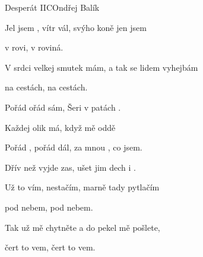 \setcounter{page}{20}
\begin{song}{Desperát II}{C}{Ondřej Balík}
\begin{SBVerse}
Jel jsem , vítr vál, svýho koně jen jsem 

v rovi, v roviná. 

V srdci velkej smutek mám, a tak se lidem vyhejbám 

na cestách, na cestách. 
\end{SBVerse}
\begin{SBChorus}
Pořád ořád sám, Šeri v patách .

Každej olik má, když mě  oddě

Pořád , pořád dál, za mnou , co jsem.

Dřív než  vyjde zas, ušet jim dech i . 
\end{SBChorus}
\begin{SBVerse}
Už to vím, nestačím, marně tady pytlačím

pod nebem, pod nebem. 

Tak už mě chytněte a do pekel mě pošlete,

čert to vem, čert to vem.
\end{SBVerse}
\begin{SBChorus}
\end{SBChorus}
\end{song}
\pagebreak
